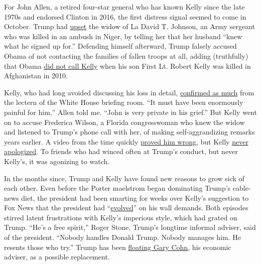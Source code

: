 For John Allen, a retired four-star general who has known Kelly since
the late 1970s and endorsed Clinton in 2016, the first distress signal
seemed to come in October. Trump had
\href{https://www.nytimes3xbfgragh.onion/2017/10/18/us/politics/trump-widow-johnson-call.html}{upset}
the widow of La David T. Johnson, an Army sergeant who was killed in an
ambush in Niger, by telling her that her husband ``knew what he signed
up for.'' Defending himself afterward, Trump falsely accused Obama of
not contacting the families of fallen troops at all, adding (truthfully)
that Obama
\href{https://www.nytimes3xbfgragh.onion/2017/10/17/us/politics/john-kelly-trump-fallen-troops.html}{did
not call Kelly} when his son First Lt. Robert Kelly was killed in
Afghanistan in 2010.

Kelly, who had long avoided discussing his loss in detail,
\href{https://www.nytimes3xbfgragh.onion/2017/10/19/us/politics/john-kelly-son-trump.html}{confirmed
as much} from the lectern of the White House briefing room. ``It must
have been enormously painful for him,'' Allen told me. ``John is very
private in his grief.'' But Kelly went on to accuse Frederica Wilson, a
Florida congresswoman who knew the widow and listened to Trump's phone
call with her, of making self-aggrandizing remarks years earlier. A
video from the time quickly
\href{https://www.nytimes3xbfgragh.onion/2017/10/20/us/politics/trump-kelly-congresswoman-wilson-niger.html}{proved
him wrong}, but Kelly
\href{https://www.cnn.com/2017/10/30/politics/john-kelly-frederica-wilson-apologize/index.html}{never
apologized}. To friends who had winced often at Trump's conduct, but
never Kelly's, it was agonizing to watch.

In the months since, Trump and Kelly have found new reasons to grow sick
of each other. Even before the Porter maelstrom began dominating Trump's
cable-news diet, the president had been smarting for weeks over Kelly's
suggestion to Fox News that the president had
``\href{http://video.foxnews.com/v/5714423988001/\#sp=show-clips}{evolved}''
on his wall demands. Both episodes stirred latent frustrations with
Kelly's imperious style, which had grated on Trump. ``He's a free
spirit,'' Roger Stone, Trump's longtime informal adviser, said of the
president. ``Nobody handles Donald Trump. Nobody manages him. He resents
those who try.'' Trump has been
\href{https://www.nytimes3xbfgragh.onion/2018/02/14/us/politics/john-kelly-rob-porter-security-clearances.html}{floating
Gary Cohn}, his economic adviser, as a possible replacement.

